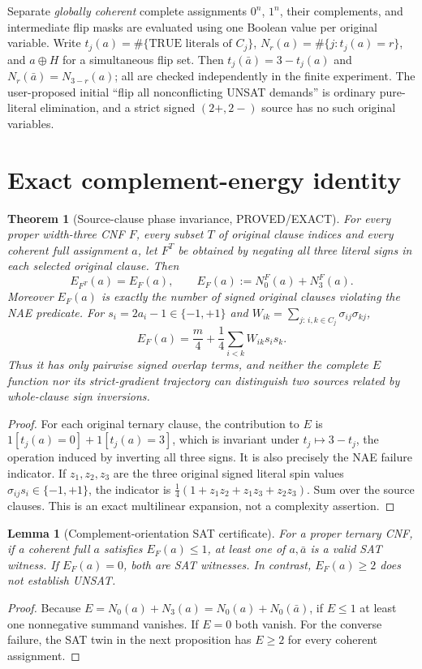 \documentclass[10pt]{article}
\newtheorem{theorem}{Theorem}
\newtheorem{lemma}{Lemma}
\begin{document}
Separate \emph{globally coherent} complete assignments $0^n$, $1^n$, their complements, and intermediate flip masks are evaluated using one Boolean value per original variable. Write $t_j(a)=\#\{\text{TRUE literals of }C_j\}$, $N_r(a)=\#\{j:t_j(a)=r\}$, and $a\oplus H$ for a simultaneous flip set. Then $t_j(\bar a)=3-t_j(a)$ and $N_r(\bar a)=N_{3-r}(a)$; all are checked independently in the finite experiment. The user-proposed initial ``flip all nonconflicting UNSAT demands'' is ordinary pure-literal elimination, and a strict signed $(2+,2-)$ source has no such original variables.
\section{Exact complement-energy identity}
\begin{theorem}[Source-clause phase invariance, PROVED/EXACT]
For every proper width-three CNF $F$, every subset $T$ of original clause indices and every coherent full assignment $a$, let $F^T$ be obtained by negating all three literal signs in each selected original clause. Then
\[
 E_{F^T}(a)=E_F(a),\qquad E_F(a):=N_0^F(a)+N_3^F(a).
\]
Moreover $E_F(a)$ is exactly the number of signed original clauses violating the NAE predicate. For $s_i=2a_i-1\in\{-1,+1\}$ and
$W_{ik}=\sum_{j:\,i,k\in C_j}\sigma_{ij}\sigma_{kj}$,
\[
 \boxed{E_F(a)=\frac m4+\frac14\sum_{i<k}W_{ik}s_is_k.}
\]
Thus it has only pairwise signed overlap terms, and neither the complete $E$ function nor its strict-gradient trajectory can distinguish two sources related by whole-clause sign inversions.
\end{theorem}
\begin{proof}
For each original ternary clause, the contribution to $E$ is $1[t_j(a)=0]+1[t_j(a)=3]$, which is invariant under $t_j\mapsto3-t_j$, the operation induced by inverting all three signs. It is also precisely the NAE failure indicator. If $z_1,z_2,z_3$ are the three original signed literal spin values $\sigma_{ij}s_i\in\{-1,+1\}$, the indicator is
$\frac14(1+z_1z_2+z_1z_3+z_2z_3)$. Sum over the source clauses. This is an exact multilinear expansion, not a complexity assertion.
\end{proof}
\begin{lemma}[Complement-orientation SAT certificate]
For a proper ternary CNF, if a coherent full $a$ satisfies $E_F(a)\le1$, at least one of $a,\bar a$ is a valid SAT witness. If $E_F(a)=0$, both are SAT witnesses. In contrast, $E_F(a)\ge2$ does not establish UNSAT.
\end{lemma}
\begin{proof}
Because $E=N_0(a)+N_3(a)=N_0(a)+N_0(\bar a)$, if $E\le1$ at least one nonnegative summand vanishes. If $E=0$ both vanish. For the converse failure, the SAT twin in the next proposition has $E\ge2$ for every coherent assignment.
\end{proof}
\end{document}
